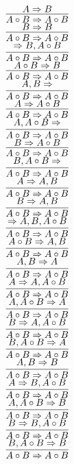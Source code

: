 \documentclass[11pt]{article}
\begin{document}
\begin{center}
\\$\infer{A\circ B\Rightarrow A\circ B}{A\Rightarrow B}$
\bigskip
\\$\infer{A\circ B\Rightarrow A\circ B}{B\Rightarrow B}$
\bigskip
\\$\infer{A\circ B\Rightarrow A\circ B}{\Rightarrow B, A\circ B}$
\bigskip
\\$\infer{A\circ B\Rightarrow A\circ B}{A\circ B\Rightarrow B}$
\bigskip
\\$\infer{A\circ B\Rightarrow A\circ B}{A, B\Rightarrow }$
\bigskip
\\$\infer{A\circ B\Rightarrow A\circ B}{A\Rightarrow A\circ B}$
\bigskip
\\$\infer{A\circ B\Rightarrow A\circ B}{A, A\circ B\Rightarrow }$
\bigskip
\\$\infer{A\circ B\Rightarrow A\circ B}{B\Rightarrow A\circ B}$
\bigskip
\\$\infer{A\circ B\Rightarrow A\circ B}{B, A\circ B\Rightarrow }$
\bigskip
\\$\infer{A\circ B\Rightarrow A\circ B}{A\Rightarrow A, B}$
\bigskip
\\$\infer{A\circ B\Rightarrow A\circ B}{B\Rightarrow A, B}$
\bigskip
\\$\infer{A\circ B\Rightarrow A\circ B}{\Rightarrow A, B, A\circ B}$
\bigskip
\\$\infer{A\circ B\Rightarrow A\circ B}{A\circ B\Rightarrow A, B}$
\bigskip
\\$\infer{A\circ B\Rightarrow A\circ B}{A, B\Rightarrow A}$
\bigskip
\\$\infer{A\circ B\Rightarrow A\circ B}{A\Rightarrow A, A\circ B}$
\bigskip
\\$\infer{A\circ B\Rightarrow A\circ B}{A, A\circ B\Rightarrow A}$
\bigskip
\\$\infer{A\circ B\Rightarrow A\circ B}{B\Rightarrow A, A\circ B}$
\bigskip
\\$\infer{A\circ B\Rightarrow A\circ B}{B, A\circ B\Rightarrow A}$
\bigskip
\\$\infer{A\circ B\Rightarrow A\circ B}{A, B\Rightarrow B}$
\bigskip
\\$\infer{A\circ B\Rightarrow A\circ B}{A\Rightarrow B, A\circ B}$
\bigskip
\\$\infer{A\circ B\Rightarrow A\circ B}{A, A\circ B\Rightarrow B}$
\bigskip
\\$\infer{A\circ B\Rightarrow A\circ B}{B\Rightarrow B, A\circ B}$
\bigskip
\\$\infer{A\circ B\Rightarrow A\circ B}{B, A\circ B\Rightarrow B}$
\bigskip

\end{center}
\end{document}

